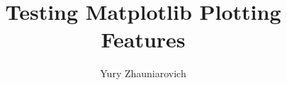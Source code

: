 \documentclass[lettersize,10pt,journal]{IEEEtran}
\begin{document}
\title{Testing Matplotlib Plotting Features}

\author{Yury Zhauniarovich}

\maketitle








\end{document}
